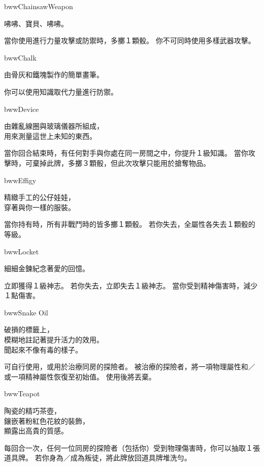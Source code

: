 \linebreak[0]%
\begin{ItemCard}{bww}{Chainsaw}{Weapon}
  \begin{CardStory}
    咈咈、寶貝、咈咈。
  \end{CardStory}
  當你使用\ThisName{}進行力量攻擊或防禦時，多擲１顆骰。\smallbreak
  你不可同時使用多樣武器攻擊。\smallbreak
\end{ItemCard}%
\linebreak[0]%
\begin{ItemCard}{bww}{Chalk}{}
  \begin{CardStory}
    由骨灰和鐵塊製作的簡單畫筆。
  \end{CardStory}
  你可以使用知識取代力量進行防禦。\smallbreak
\end{ItemCard}%
\linebreak[0]%
\begin{ItemCard}{bww}{Device}{}
  \begin{CardStory}
    由雜亂線圈與玻璃儀器所組成，\\
    用來測量這世上未知的東西。
  \end{CardStory}
  當你回合結束時，有任何對手與你處在同一房間之中，你提升１級知識。\smallbreak
  當你攻擊時，可棄掉此牌，多擲３顆骰，但此次攻擊只能用於搶奪物品。\smallbreak
\end{ItemCard}%
\linebreak[0]%
\begin{ItemCard}{bww}{Effigy}{}
  \begin{CardStory}
    精緻手工的公仔娃娃，\\
    穿著與你一樣的服裝。
  \end{CardStory}
  當你持有\ThisName{}時，所有非戰鬥時的皆多擲１顆骰。\smallbreak
  若你失去\ThisName{}，全屬性各失去１顆骰的等級。\smallbreak
\end{ItemCard}%
\linebreak[0]%
\begin{ItemCard}{bww}{Locket}{}
  \begin{CardStory}
    細細金鍊紀念著愛的回憶。
  \end{CardStory}
  立即獲得１級神志。\smallbreak
  若你失去\ThisName{}，立即失去１級神志。\smallbreak
  當你受到精神傷害時，減少１點傷害。\smallbreak
\end{ItemCard}%
\linebreak[0]%
\begin{ItemCard}{bww}{Snake Oil}{}
  \begin{CardStory}
    破損的標籤上，\\
    模糊地註記著提升活力的效用。\\
    聞起來不像有毒的樣子。
  \end{CardStory}
  可自行使用，或用於治療同房的探險者。\smallbreak
  被\ThisName{}治療的探險者，將一項物理屬性和／或一項精神屬性恢復至初始值。\smallbreak
  使用後將\ThisName{}丟棄。\smallbreak
\end{ItemCard}%
\linebreak[0]%
\begin{ItemCard}{bww}{Teapot}{}
  \begin{CardStory}
    陶瓷的精巧茶壺，\\
    鑲嵌著粉紅色花紋的裝飾，\\
    顯露出高貴的質感。
  \end{CardStory}
  每回合一次，任何一位同房的探險者（包括你）受到物理傷害時，你可以抽取１張道具牌。\smallbreak
  若你身為／成為叛徒，將此牌放回道具牌堆洗勻。\smallbreak
\end{ItemCard}%
\linebreak[0]%
